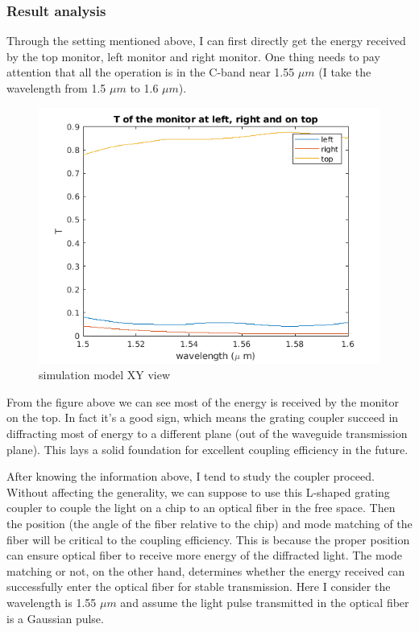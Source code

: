 \documentclass[]{article}
\begin{document}
\subsubsection{Result analysis}
Through the setting mentioned above, I can first directly get the energy received by the top monitor, left monitor and right monitor. One thing needs to pay attention that all the operation is in the C-band near 1.55 $\mu m$ (I take the wavelength from 1.5 $\mu m$ to 1.6 $\mu m$). 

\begin{figure}[H]
	\centering
	\includegraphics[width=0.7\linewidth]{figures/figure4}
	\caption{simulation model XY view}
	\label{fig:figure3}
\end{figure}

From the figure above we can see most of the energy is received by the monitor on the top. In fact it's a good sign, which means the grating coupler succeed in diffracting most of energy to a different plane (out of the waveguide transmission plane). This lays a solid foundation for excellent coupling efficiency in the future.

After knowing the information above, I tend to study the coupler proceed. Without affecting the generality, we can suppose to use this L-shaped grating coupler to couple the light on a chip to an optical fiber in the free space. Then the position (the angle of the fiber relative to the chip) and mode matching of the fiber will be critical to the coupling efficiency. This is because the proper position can ensure optical fiber to receive more energy of the diffracted light. The mode matching or not, on the other hand, determines whether the energy received can successfully enter the optical fiber for stable transmission. Here I consider the wavelength is 1.55 $\mu m$ and assume the light pulse transmitted in the optical fiber is a Gaussian pulse.
\end{document}
